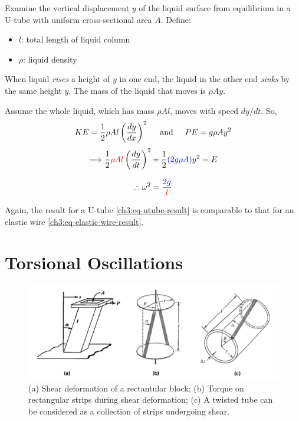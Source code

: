 Examine the vertical displacement $y$ of the liquid surface from equilibrium in a U-tube with uniform cross-sectional area $A$. Define:
\begin{itemize}
	\item $l$: total length of liquid column
	\item $\rho$: liquid density
\end{itemize}

When liquid \textit{rises} a height of $y$ in one end, the liquid in the other end \textit{sinks} by the same height $y$. The mass of the liquid that moves is $\rho Ay$. 

Assume the whole liquid, which has mass $\rho Al$, moves with speed $dy/dt$. So,
\[ KE = \frac{1}{2} \rho Al \left(\frac{dy}{dx}\right)^2 \hspace{0.5cm}\text{and}\hspace{0.5cm}
PE = g\rho Ay^2 \]
\[ \Longrightarrow \frac{1}{2} \textcolor{red}{\rho Al} \left( \frac{dy}{dt} \right)^2 
+ \frac{1}{2} \textcolor{blue}{(2g\rho A)} y^2 = E  \] 

\begin{equation}
\therefore \omega^2 = \frac{\textcolor{blue}{2g}}{\textcolor{red}{l}} \label{ch3:eq-utube-result}
\end{equation}

Again, the result for a U-tube \eqref{ch3:eq-utube-result} is comparable to that for an elastic wire \eqref{ch3:eq-elastic-wire-result}.

\section{Torsional Oscillations} \label{ch3:sec-torsional}

\begin{figure}
	\centering
	\includegraphics[scale=0.7]{phys232/Ch3-shear-torsion.png} \caption{(a) Shear deformation of a rectantular block; (b) Torque on rectangular strips during shear deformation; (c) A twisted tube can be considered as a collection of strips undergoing shear.}\label{ch3:fig-shear-torsion}
\end{figure}

